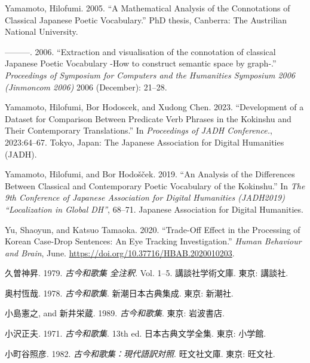 \documentclass[
  letterpaper,
  DIV=11,
  numbers=noendperiod]{scrartcl}
\newlength{\cslhangindent}
\newenvironment{CSLReferences}[2] %
 {\begin{list}{}{%
  \setlength{\itemindent}{0pt}
  \setlength{\leftmargin}{0pt}
  \setlength{\parsep}{0pt}
  \ifodd #1
   \setlength{\leftmargin}{\cslhangindent}
   \setlength{\itemindent}{-1\cslhangindent}
  \fi
  \setlength{\itemsep}{#2\baselineskip}}}
 {\end{list}}
\begin{document}
\begin{CSLReferences}{1}{0}
Yamamoto, Hilofumi. 2005. {``A Mathematical Analysis of the Connotations
of Classical {Japanese} Poetic Vocabulary.''} PhD thesis, Canberra: The
Austrilian National University.

---------. 2006. {``{Extraction and visualisation of the connotation of
classical Japanese Poetic Vocabulary -How to construct semantic space by
graph-}.''} \emph{Proceedings of Symposium for Computers and the
Humanities Symposium 2006 (Jinmoncom 2006)} 2006 (December): 21--28.

Yamamoto, Hilofumi, Bor Hodoscek, and Xudong Chen. 2023. {``Development
of a Dataset for Comparison Between Predicate Verb Phrases in the
{Kokinshu} and Their Contemporary Translations.''} In \emph{Proceedings
of {JADH} Conference.}, 2023:64--67. Tokyo, Japan: The Japanese
Association for Digital Humanities (JADH).

Yamamoto, Hilofumi, and Bor Hodošček. 2019. {``An {Analysis} of the
{Differences Between Classical} and {Contemporary Poetic Vocabulary} of
the {Kokinshu}.''} In \emph{The 9th {Conference} of {Japanese
Association} for {Digital Humanities} ({JADH2019}) {``{Localization} in
{Global DH}''}}, 68--71. Japanese Association for Digital Humanities.

Yu, Shaoyun, and Katsuo Tamaoka. 2020. {``Trade-Off Effect in the
Processing of {Korean} Case-Drop Sentences: {An} Eye Tracking
Investigation.''} \emph{Human Behaviour and Brain}, June.
\url{https://doi.org/10.37716/HBAB.2020010203}.

久曽神昇. 1979. \emph{{古今和歌集 全注釈}}. Vol. 1--5. {講談社学術文庫}.
東京: 講談社.

奥村恆哉. 1978. \emph{{古今和歌集}}. {新潮日本古典集成}. 東京: 新潮社.

小島憲之, and 新井栄蔵. 1989. \emph{{古今和歌集}}. 東京: 岩波書店.

小沢正夫. 1971. \emph{{古今和歌集}}. 13th ed. {日本古典文学全集}. 東京:
小学館.

小町谷照彦. 1982. \emph{古今和歌集：現代語訳対照}. 旺文社文庫. 東京:
旺文社.


\end{CSLReferences}
\end{document}
